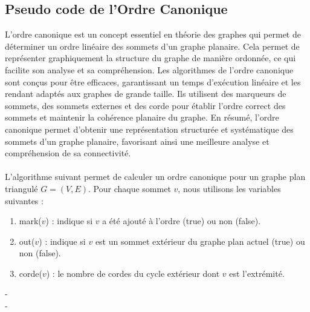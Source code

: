 \documentclass[hidelinks,letterpaper,12pt]{article}
\begin{document}
\newpage
\subsection{Pseudo code de l'Ordre Canonique}
L'ordre canonique est un concept essentiel en théorie des graphes qui permet de déterminer un ordre linéaire des sommets d'un graphe planaire. Cela permet de représenter graphiquement la structure du graphe de manière ordonnée, ce qui facilite son analyse et sa compréhension. Les algorithmes de l'ordre canonique sont conçus pour être efficaces, garantissant un temps d'exécution linéaire et les rendant adaptés aux graphes de grande taille. Ils utilisent des marqueurs de sommets, des sommets externes et des corde pour établir l'ordre correct des sommets et maintenir la cohérence planaire du graphe. En résumé, l'ordre canonique permet d'obtenir une représentation structurée et systématique des sommets d'un graphe planaire, favorisant ainsi une meilleure analyse et compréhension de sa connectivité.
\\ \\
L'algorithme suivant \citep{TakaoSaidur} permet de calculer un ordre canonique pour un graphe plan triangulé $G = (V, E)$. Pour chaque sommet $v$, nous utilisons les variables suivantes :
\begin{enumerate}
    \item mark($v$) : indique si $v$ a été ajouté à l'ordre (true) ou non (false).
    \item out($v$) : indique si $v$ est un sommet extérieur du graphe plan actuel (true) ou non (false).
    \item corde($v$) : le nombre de cordes du cycle extérieur dont $v$ est l'extrémité.
\end{enumerate}
{\color{white}-} 
\\ 
{\color{white}-} 
\end{document}
